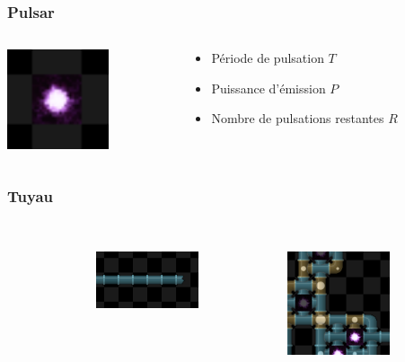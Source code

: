 \documentclass{beamer}
\begin{document}
\begin{frame}
	\frametitle{Pulsar}
    \begin{columns}[T]
        \begin{column}{.3\textwidth}
            \includegraphics[width=3cm]{pictures/pulsar}
        \end{column}
        \begin{column}{.7\textwidth}
            \begin{itemize}
                \item Période de pulsation $T$
                \item Puissance d'émission $P$
                \item Nombre de pulsations restantes $R$
            \end{itemize}
        \end{column}
    \end{columns}
\end{frame}

\begin{frame}
	\frametitle{Tuyau}
    \begin{columns}[T]
        \begin{column}{.05\textwidth}
        \end{column}
        \begin{column}{.4\textwidth}
             \\
            \vspace{1.5cm}
            \includegraphics[width=3cm]{pictures/tuyau}
        \end{column}
        \begin{column}{.55\textwidth}
             \\
            \vspace{0.8cm}
            \includegraphics[width=3cm]{pictures/super-tuyau}
        \end{column}
    \end{columns}
\end{frame}
\end{document}
